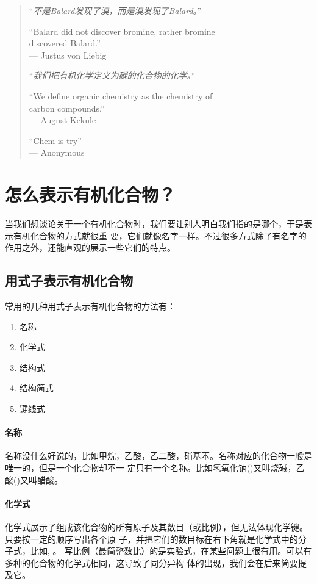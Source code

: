 \begin{quotation}
``\emph{不是Balard发现了溴，而是溴发现了Balard。}''

{\ttfamily ``Balard did not discover bromine, rather bromine \\
discovered Balard.''
\\--- Justus von Liebig}

``\emph{我们把有机化学定义为碳的化合物的化学。}''

{\ttfamily ``We define organic chemistry as the chemistry of \\
carbon compounds.''
\\ --- August Kekule}

{\ttfamily ``Chem is try''
\\ --- Anonymous}
\end{quotation}

\section{怎么表示有机化合物？}
当我们想谈论关于一个有机化合物时，我们要让别人明白我们指的是哪个，于是表示有机化合物的方式就很重
要，它们就像名字一样。不过很多方式除了有名字的作用之外，还能直观的展示一些它们的特点。

\subsection{用式子表示有机化合物}
常用的几种用式子表示有机化合物的方法有：
\begin{enumerate}
\item 名称
\item 化学式
\item 结构式
\item 结构简式
\item 键线式
\end{enumerate}

\paragraph{名称}
名称没什么好说的，比如甲烷，乙酸，乙二酸，硝基苯。名称对应的化合物一般是唯一的，但是一个化合物却不一
定只有一个名称。比如氢氧化钠()又叫烧碱，乙酸()又叫醋酸。

\paragraph{化学式}
化学式展示了组成该化合物的所有原子及其数目（或比例），但无法体现化学键。只要按一定的顺序写出各个原
子，并把它们的数目标在右下角就是化学式中的分子式，比如, 。
写比例（最简整数比）的是实验式，在某些问题上很有用。可以有多种的化合物的化学式相同，这导致了同分异构
体的出现，我们会在后来简要提及它。

